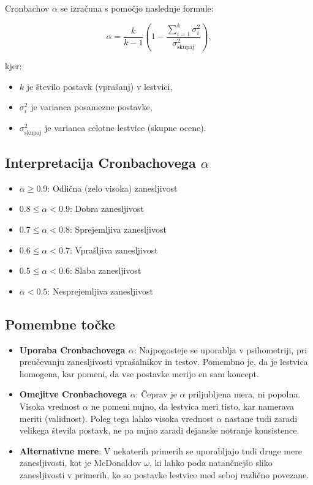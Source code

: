 Cronbachov $\alpha$ se izračuna s pomočjo naslednje formule:

\[\alpha = \frac{k}{k - 1} \left(1 - \frac{\sum_{i=1}^{k} \sigma^2_{i}}{\sigma^2_{\text{skupaj}}}\right),\]

kjer:
\begin{itemize}
    \item $k$ je število postavk (vprašanj) v lestvici,
    \item $\sigma^2_{i}$ je varianca posamezne postavke,
    \item $\sigma^2_{\text{skupaj}}$ je varianca celotne lestvice (skupne ocene).
\end{itemize}

\subsection*{Interpretacija Cronbachovega $\alpha$}

\begin{itemize}
    \item $\alpha \geq 0.9$: Odlična (zelo visoka) zanesljivost
    \item $0.8 \leq \alpha < 0.9$: Dobra zanesljivost
    \item $0.7 \leq \alpha < 0.8$: Sprejemljiva zanesljivost
    \item $0.6 \leq \alpha < 0.7$: Vprašljiva zanesljivost
    \item $0.5 \leq \alpha < 0.6$: Slaba zanesljivost
    \item $\alpha < 0.5$: Nesprejemljiva zanesljivost
\end{itemize}

\subsection*{Pomembne točke}

\begin{itemize}
    \item \textbf{Uporaba Cronbachovega $\alpha$}: Najpogosteje se uporablja v psihometriji, pri preučevanju zanesljivosti vprašalnikov in testov. Pomembno je, da je lestvica homogena, kar pomeni, da vse postavke merijo en sam koncept.
    \item \textbf{Omejitve Cronbachovega $\alpha$}: Čeprav je $\alpha$ priljubljena mera, ni popolna. Visoka vrednost $\alpha$ ne pomeni nujno, da lestvica meri tisto, kar namerava meriti (validnost). Poleg tega lahko visoka vrednost $\alpha$ nastane tudi zaradi velikega števila postavk, ne pa nujno zaradi dejanske notranje konsistence.
    \item \textbf{Alternativne mere}: V nekaterih primerih se uporabljajo tudi druge mere zanesljivosti, kot je McDonaldov $\omega$, ki lahko poda natančnejšo sliko zanesljivosti v primerih, ko so postavke lestvice med seboj različno povezane.
\end{itemize}


